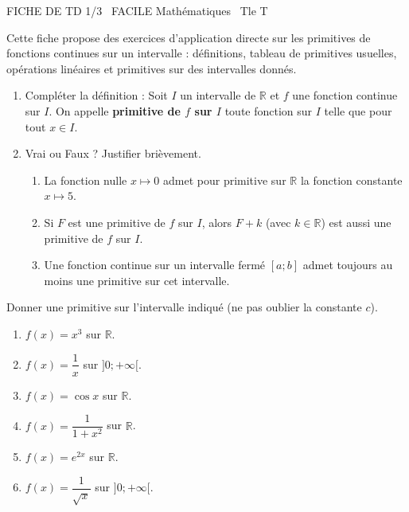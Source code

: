 \documentclass[11pt]{article}
\begin{document}
\begin{tcolorbox}[enhanced,colback=popink,colframe=popink,arc=10pt,boxrule=0pt,left=12pt,right=12pt,top=9pt,bottom=9pt]
{\color{white}\popxbold\small FICHE DE TD 1/3 \textbullet\ FACILE \hfill Mathématiques \textbullet\ Tle T\par}
\end{tcolorbox}
\vspace{4pt}
\noindent Cette fiche propose des exercices d'application directe sur les primitives de fonctions continues sur un intervalle : définitions, tableau de primitives usuelles, opérations linéaires et primitives sur des intervalles donnés.

\begin{exercice}
\begin{enumerate}
    \item Compléter la définition : Soit $I$ un intervalle de $\mathbb{R}$ et $f$ une fonction continue sur $I$. On appelle \textbf{primitive de $f$ sur $I$} toute fonction \underline{\hspace{5cm}} sur $I$ telle que \underline{\hspace{5cm}} pour tout $x \in I$.
    \item Vrai ou Faux ? Justifier brièvement.
    \begin{enumerate}
        \item La fonction nulle $x \mapsto 0$ admet pour primitive sur $\mathbb{R}$ la fonction constante $x \mapsto 5$.
        \item Si $F$ est une primitive de $f$ sur $I$, alors $F + k$ (avec $k \in \mathbb{R}$) est aussi une primitive de $f$ sur $I$.
        \item Une fonction continue sur un intervalle fermé $[a;b]$ admet toujours au moins une primitive sur cet intervalle.
    \end{enumerate}
\end{enumerate}
\end{exercice}

\begin{exercice}
Donner une primitive sur l'intervalle indiqué (ne pas oublier la constante $c$).
\begin{enumerate}
    \item $f(x) = x^3$ sur $\mathbb{R}$.
    \item $f(x) = \dfrac{1}{x}$ sur $]0; +\infty[$.
    \item $f(x) = \cos x$ sur $\mathbb{R}$.
    \item $f(x) = \dfrac{1}{1+x^2}$ sur $\mathbb{R}$.
    \item $f(x) = e^{2x}$ sur $\mathbb{R}$.
    \item $f(x) = \dfrac{1}{\sqrt{x}}$ sur $]0; +\infty[$.
\end{enumerate}
\end{exercice}
\end{document}
